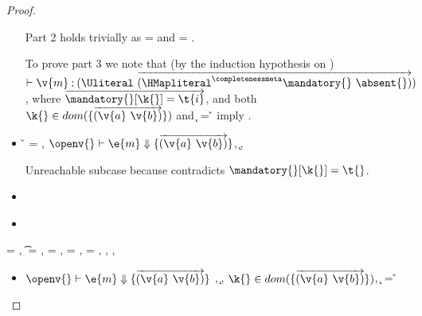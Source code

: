\begin{lemma}
\begin{proof}
\begin{case}[T-GetHMap]
\begin{itemize}
\begin{subcase}[B-Get]
         Part 2 holds trivially as \thenprop{\prop{}} = {\topprop{}}
         and \elseprop{\prop{}} = {\topprop{}}.

         To prove part 3 we note that (by the induction hypothesis on )
         $\judgementtwo{}{\v{m}}{\Unionsplice{\overrightarrow {\HMapgeneric {\mandatory{}} {\absent{}}}}}$,
         where $\overrightarrow{\inmandatory{\k{}}{\t{i}}{\mandatory{}}}$, and 
         both
         $\keyinmap{\k{}}{\curlymap{\overrightarrow{({\v{a}}\ {\v{b}})}}}$
         and
          {\k{}} = {\v{}}
         imply .

      \end{subcase}
    \item[]
      \begin{subcase}[B-GetMissing]
        \v{} = \nil,
        $\opsem {\openv{}}
        {\e{m}} {\curlymap{\overrightarrow{({\v{a}}\ {\v{b}})}}}$,
       \opsem {\openv{}} {} {\k{}},

       Unreachable subcase because 
       contradicts ${\inmandatory{\k{}}{\t{}}{\mandatory{}}}$.
      \end{subcase}
    \item[]
      \begin{subcase}[BE-Get1]
      \end{subcase}
    \item[]
      \begin{subcase}[BE-Get2]
      \end{subcase}
  \end{itemize}
\end{case}

\begin{case}[T-GetHMapAbsent]
  \e{} = { {}},
  \t{} = \Nil,
  \thenprop{\prop{}} = {\topprop{}},
  \elseprop{\prop{}} = {\topprop{}},
  \object{} = {\replacefor
               { {\x{}}}
                          {}
                          {\x{}}},
  \judgementtwo {\propenv{}} {} {},
  \judgement {\propenv{}} {} {\HMapgeneric {\mandatory{}} {\absent}}
           { {}}
           {},
  {\inabsent{\k{}}{\absent{}}}


  \begin{itemize}
    \item[]
      \begin{subcase}[B-Get]
        $\opsem {\openv{}}
        {\e{m}} {\curlymap{\overrightarrow{({\v{a}}\ {\v{b}})}}}$
        ,
         \opsem {\openv{}} {} {\k{}},
         $\keyinmap{\k{}}{\curlymap{\overrightarrow{({\v{a}}\ {\v{b}})}}}$,
          {\k{}} = {\v{}}


\end{subcase}
\end{itemize}
\end{case}
\end{proof}
\end{lemma}
